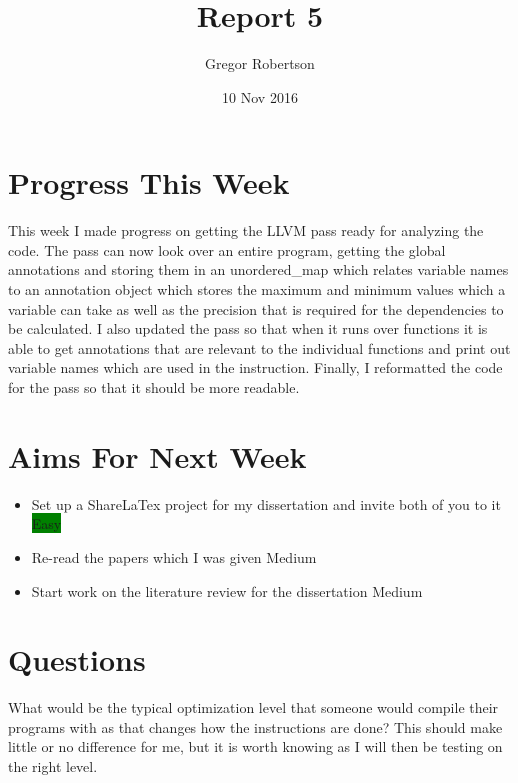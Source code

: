 \documentclass{article}
\title{Report 5}
\author{Gregor Robertson}
\date{10 Nov 2016}
\begin{document}
 
\maketitle
 
\section*{Progress This Week}
This week I made progress on getting the LLVM pass ready for analyzing the code. The pass can now look over an entire program, getting the global annotations and storing them in an unordered\_map which relates variable names to an annotation object which stores the maximum and minimum values which a variable can take as well as the precision that is required for the dependencies to be calculated. I also updated the pass so that when it runs over functions it is able to get annotations that are relevant to the individual functions and print out variable names which are used in the instruction. Finally, I reformatted the code for the pass so that it should be more readable.

\section*{Aims For Next Week}
\begin{itemize}
	\item Set up a ShareLaTex project for my dissertation and invite both of you to it \colorbox{Green}{\color{Black}Easy}
	\item Re-read the papers which I was given \colorbox{BurntOrange}{\color{Black}Medium}
	\item Start work on the literature review for the dissertation \colorbox{BurntOrange}{\color{Black}Medium}
\end{itemize}

\section*{Questions}
What would be the typical optimization level that someone would compile their programs with as that changes how the instructions are done? This should make little or no difference for me, but it is worth knowing as I will then be testing on the right level.

\medskip
 
\printbibliography
\end{document}
